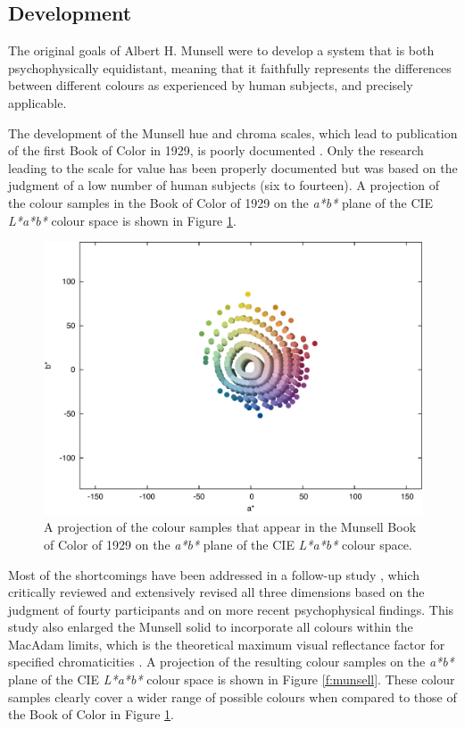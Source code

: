 \subsection{Development}

The original goals of Albert H. Munsell were to develop a system that
is both psychophysically equidistant, meaning that it faithfully
represents the differences between different colours as experienced by
human subjects, and precisely applicable.

The development of the Munsell hue and chroma scales, which lead to
publication of the first Book of Color in 1929, is poorly documented
\citep{berns82development}. Only the research leading to the scale for
value has been properly documented but was based on the judgment of a
low number of human subjects (six to fourteen). A projection of the
colour samples in the Book of Color of 1929 on the \emph{a*b*} plane
of the CIE \emph{L*a*b*} colour space is shown in Figure
\ref{f:book-of-color-1929}.

\begin{figure}[htbp]
\begin{center}
\includegraphics[width=.85\textwidth]{./spaces/figures/book-of-color-1929.pdf}
\caption[Colour samples of The Munsell Book of Color of 1929]{A projection of the colour samples that appear in the Munsell Book of Color of 1929 on the \emph{a*b*} plane of the CIE \emph{L*a*b*} colour space.}
\label{f:book-of-color-1929}
\end{center}
\end{figure}

Most of the shortcomings have been addressed in a follow-up study
\citep{newhall42final}, which critically reviewed and extensively
revised all three dimensions based on the judgment of fourty
participants and on more recent psychophysical findings. This study
also enlarged the Munsell solid to incorporate all colours within the
MacAdam limits, which is the theoretical maximum visual reflectance
factor for specified chromaticities \citep{macadam35maximum}. A
projection of the resulting colour samples on the \emph{a*b*} plane of
the CIE \emph{L*a*b*} colour space is shown in Figure
\ref{f:munsell}. These colour samples clearly cover a wider range of
possible colours when compared to those of the Book of Color in Figure
\ref{f:book-of-color-1929}.

